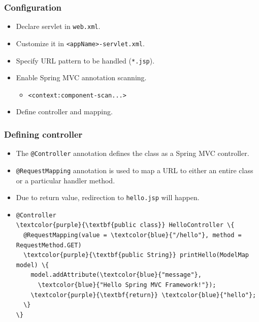 \documentclass[10pt,xcolor=pdflatex, table]{beamer}
\begin{document}
\begin{frame}[fragile]\frametitle{Configuration}
	\begin{itemize}
		\item Declare servlet in \texttt{web.xml}.
		\item Customize it in \verb+<appName>-servlet.xml+.
		\item Specify URL pattern to be handled (\texttt{*.jsp}).
		\item Enable Spring MVC annotation scanning.
          \begin{itemize}
        	\item \verb'<context:component-scan...>' 
          \end{itemize}
		\item Define controller and mapping.
	\end{itemize}
\end{frame}


\begin{frame}[fragile]\frametitle{Defining controller}
	\begin{itemize}
		\item The \texttt{@Controller} annotation defines the class as a Spring MVC controller.
        \medskip
		\item \texttt{@RequestMapping} annotation is used to map a URL to either an entire class or a particular handler method.
        \medskip
		\item Due to return value, redirection to \texttt{hello.jsp} will happen.
		\item[]
        	\medskip
			\begin{Verbatim}[fontsize=\footnotesize, commandchars=\\\{\}] 
@Controller
\textcolor{purple}{\textbf{public class}} HelloController \{
  @RequestMapping(value = \textcolor{blue}{"/hello"}, method = RequestMethod.GET)
  \textcolor{purple}{\textbf{public String}} printHello(ModelMap model) \{
    model.addAttribute(\textcolor{blue}{"message"},
      \textcolor{blue}{"Hello Spring MVC Framework!"});
    \textcolor{purple}{\textbf{return}} \textcolor{blue}{"hello"};
  \}
\}
			\end{Verbatim}
    \end{itemize}
\end{frame}
\end{document}
